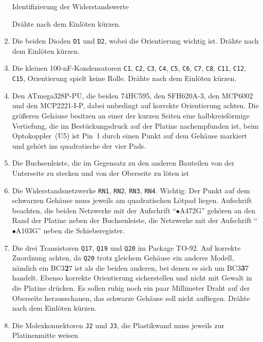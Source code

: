 \documentclass[paper=a4, open=any, numbers=noenddot]{scrbook}
\begin{document}
\begin{enumerate}
\begin{table}
\begin{center}
\begin{minipage}[b]{.2\textwidth}
						      \end{minipage}
					      \end{center}
					      \caption{Identifizierung der Widerstandswerte}
					      \label{tab:widerstandswerte}
				      \end{table}
				    Drähte nach dem Einlöten kürzen.

					\item Die beiden Dioden \texttt{D1} und \texttt{D2}, wobei die Orientierung wichtig ist. Drähte nach dem Einlöten kürzen.
					\item Die kleinen 100-nF-Kondensatoren \texttt{C1}, \texttt{C2}, \texttt{C3}, \texttt{C4}, \texttt{C5}, \texttt{C6}, \texttt{C7}, \texttt{C8}, \texttt{C11}, \texttt{C12}, \texttt{C15}, Orientierung spielt keine Rolle. Drähte nach dem Einlöten kürzen.
					\item Den ATmega328P-PU, die beiden 74HC595, den SFH620A-3, den MCP6002 und den MCP2221-I-P, dabei unbedingt auf korrekte Orientierung achten. Die größeren Gehäuse besitzen an einer der kurzen Seiten eine halbkreisförmige Vertiefung, die im Bestückungsdruck auf der Platine nachempfunden ist, beim Optokoppler~(U5) ist Pin~1 durch einen Punkt auf dem Gehäuse markiert und gehört ins quadratische der vier Pads.
					\item Die Buchsenleiste, die im Gegensatz zu den anderen Bauteilen von der Unterseite zu stecken und von der Oberseite zu löten ist
					\item Die Widerstandsnetzwerke \texttt{RN1}, \texttt{RN2}, \texttt{RN3}, \texttt{RN4}. Wichtig: Der Punkt auf dem schwarzen Gehäuse muss jeweils am quadratischen Lötpad liegen. Aufschrift beachten, die beiden Netzwerke mit der Aufschrift \enquote{$\bullet$A472G} gehören an den Rand der Platine neben der Buchsenleiste, die Netzwerke mit der Aufschrift \enquote{$\bullet$A103G} neben die Schieberegister.
					\item Die drei Transistoren \texttt{Q17}, \texttt{Q19} und \texttt{Q20} im Package TO-92. Auf korrekte Zuordnung achten, da \texttt{Q20} trotz gleichem Gehäuse ein anderes Modell, nämlich ein BC3\textbf{2}7 ist als die beiden anderen, bei denen es sich um BC3\textbf{3}7 handelt. Ebenso korrekte Orientierung sicherstellen und nicht mit Gewalt in die Platine drücken. Es sollen ruhig noch ein paar Millimeter Draht auf der Oberseite herausschauen, das schwarze Gehäuse soll nicht aufliegen. Drähte nach dem Einlöten kürzen.
					\item Die Molexkonnektoren \texttt{J2} und \texttt{J3}, die Plastikwand muss jeweils zur Platinenmitte weisen

\end{enumerate}
\end{document}
